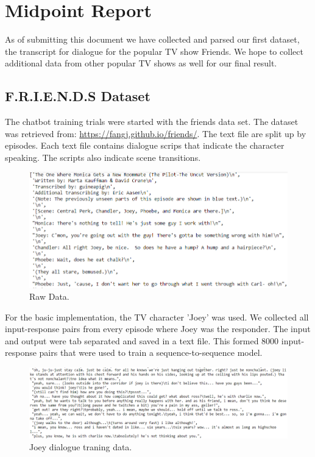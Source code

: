 \documentclass{article}
\begin{document}
 
\section{Midpoint Report}
As of submitting this document we have collected and parsed our first dataset, the transcript for dialogue for the popular TV show Friends.
We hope to collect additional data from other popular TV shows as well for our final result.

\subsection*{F.R.I.E.N.D.S Dataset}
The chatbot training trials were started with the friends data set. The dataset was retrieved from: \url{https://fangj.github.io/friends/}. The text file are split up by episodes. Each text file contains dialogue scrips that indicate the character speaking. The scripts also indicate scene transitions.\\
\begin{figure}[h]
  \centering
  \includegraphics[width=140mm]{rawData.PNG}
  \caption{Raw Data.}
\end{figure}

For the basic implementation, the TV character 'Joey' was used. 
We collected all input-response pairs from every episode where Joey was the responder.
The input and output were tab separated and saved in a text file. 
This formed 8000 input-response pairs that were used to train a sequence-to-sequence model.
\begin{figure}[h]
  \centering
  \includegraphics[width=120mm]{processedData.PNG}
  \caption{Joey dialogue traning data.}
\end{figure}
\end{document}
